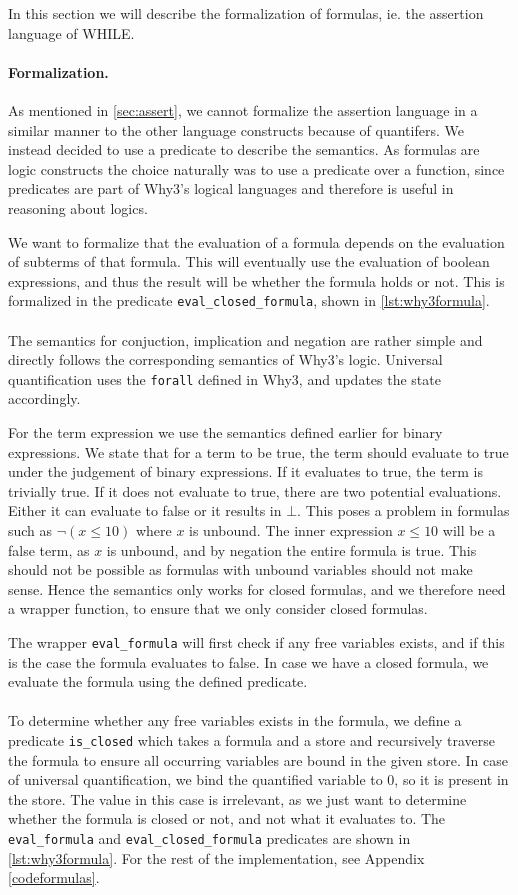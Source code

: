 In this section we will describe the formalization of formulas, ie. the assertion language of WHILE.

\paragraph{Formalization.}
As mentioned in \ref{sec:assert}, we cannot formalize the assertion language in a similar manner to
the other language constructs because of quantifers.
We instead decided to use a predicate to describe the semantics.
As formulas are logic constructs the choice naturally was to use a predicate over a function,
since predicates are part of Why3's logical languages and therefore is useful in reasoning about logics.

We want to formalize that the evaluation of a formula depends on the evaluation of subterms
of that formula. This will eventually use the evaluation of boolean expressions, and thus
the result will be whether the formula holds or not.
This is formalized in the predicate \texttt{eval\_closed\_formula}, shown in \autoref{lst:why3formula}.
\\~\\
The semantics for conjuction, implication and negation are rather simple and directly follows the corresponding
semantics of Why3's logic.
Universal quantification uses the \texttt{forall} defined in Why3, and updates the state accordingly.

For the term expression we use the semantics defined earlier for binary expressions.
We state that for a term to be true, the term should evaluate to true under the judgement of binary expressions.
If it evaluates to true, the term is trivially true.
If it does not evaluate to true, there are two potential evaluations.
Either it can evaluate to false or it results in $\bot$.
This poses a problem in formulas such as $\neg (x \leq 10)$ where $x$ is unbound.
The inner expression $x \leq 10$ will be a false term, as $x$ is unbound, and by negation the entire formula is true.
This should not be possible as formulas with unbound variables should not make sense.
Hence the semantics only works for closed formulas, and we therefore need a wrapper function, to ensure that we only consider closed formulas.

The wrapper \texttt{eval\_formula} will first check if any free variables exists, and
if this is the case the formula evaluates to false.
In case we have a closed formula, we evaluate the formula using the defined predicate.
\\~\\
To determine whether any free variables exists in the formula, we define a predicate
\texttt{is\_closed} which takes a formula and a store and recursively traverse the formula to ensure all occurring variables are bound in the given store.
In case of universal quantification, we bind the quantified variable to 0,
so it is present in the store. The value in this case is irrelevant, as we just want to determine whether the formula is closed or not, and not what it evaluates to.
The \texttt{eval\_formula} and \texttt{eval\_closed\_formula} predicates are shown in
\autoref{lst:why3formula}. For the rest of the implementation, see Appendix \ref{codeformulas}.

